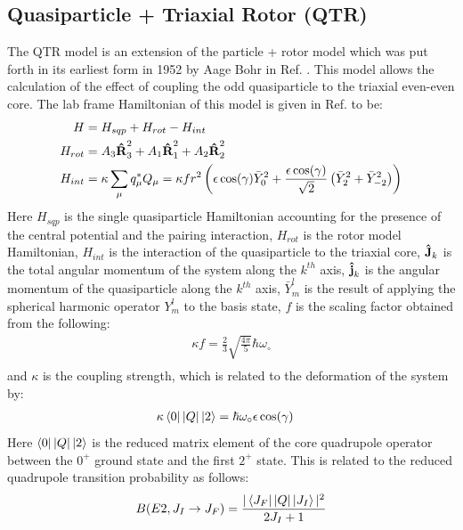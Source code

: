 \subsection{Quasiparticle + Triaxial Rotor (QTR)}
\label{sec:models-qtr}
The QTR model is an extension of the particle + rotor model which was put forth in its earliest form in 1952 by Aage Bohr in Ref. \cite{bohrParticlePlusRotor}. This model allows the calculation of the effect of coupling the odd quasiparticle to the triaxial even-even core. The lab frame Hamiltonian of this model is given in Ref. \cite{frauendorfTransverseWobbling} to be:
\begin{align}
\label{eqn:chp2-qtr-hamil}
H&=H_{sqp}+H_{rot}-H_{int}\\
H_{rot}&=A_3\boldsymbol{\hat{\textbf{R}}}_3^2+A_1\boldsymbol{\hat{\textbf{R}}}_1^2+A_2\boldsymbol{\hat{\textbf{R}}}_2^2\\
H_{int}&=\kappa \sum\limits_{\mu}^{}q^*_{\mu}Q_{\mu} = \kappa{} f r^2 \left(\epsilon \cos(\gamma) \bar{Y}^2_0 + \frac{\epsilon \cos(\gamma)}{\sqrt{2}}\left(\bar{Y}^2_2 + \bar{Y}^2_{-2}\right)\right)
\end{align}
Here $H_{sqp}$ is the single quasiparticle Hamiltonian accounting for the presence of the central potential and the pairing interaction, $H_{rot}$ is the rotor model Hamiltonian, $H_{int}$ is the interaction of the quasiparticle to the triaxial core, $\boldsymbol{\hat{\textbf{J}}}_k$ is the total angular momentum of the system along the $k^{th}$ axis, $\boldsymbol{\hat{\textbf{j}}}_k$ is the angular momentum of the quasiparticle along the $k^{th}$ axis, $\bar{Y}^l_m$ is the result of applying the spherical harmonic operator $Y^l_m$ to the basis state, $f$ is the scaling factor obtained from the following:
\begin{align}
\label{eqn:chp2-qtr-int-hamil-scaling}
\kappa f = \frac{2}{3}\sqrt{\frac{4\pi}{5}}\hbar\omega_{\circ}\\
\end{align}
and $\kappa$ is the coupling strength, which is related to the deformation of the system by:
\begin{align}
\label{eqn:chp2-qtr-int-hamil-coupling}
\kappa \Bra{0}|Q|\Ket{2} & = \hbar\omega_{\circ} \epsilon \cos(\gamma)
\end{align}
Here $\Bra{0}|Q|\Ket{2}$ is the reduced matrix element of the core quadrupole operator between the  $0^+$ ground state and the first $2^+$ state. This is related to the reduced quadrupole transition probability as follows:
\begin{equation}
\label{eqn:chp2-red-mat-el-to-red-trans-prob}
B(E2,J_I\rightarrow{}J_F)=\frac{|\Bra{J_F}|Q|\Ket{J_I}|^2}{2J_I+1}
\end{equation}

